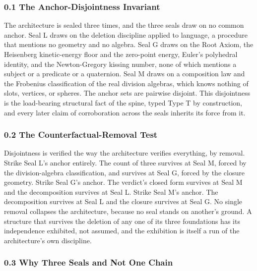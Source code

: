 \documentclass[10pt,twocolumn]{article}
\begin{document}
\hypertarget{the-anchor-disjointness-invariant}{%
\subsubsection{0.1 The Anchor-Disjointness
Invariant}\label{the-anchor-disjointness-invariant}}

The architecture is sealed three times, and the three seals draw on no
common anchor. Seal L draws on the deletion discipline applied to
language, a procedure that mentions no geometry and no algebra. Seal G
draws on the Root Axiom, the Heisenberg kinetic-energy floor and the
zero-point energy, Euler's polyhedral identity, and the Newton-Gregory
kissing number, none of which mentions a subject or a predicate or a
quaternion. Seal M draws on a composition law and the Frobenius
classification of the real division algebras, which knows nothing of
slots, vertices, or spheres. The anchor sets are pairwise disjoint. This
disjointness is the load-bearing structural fact of the spine, typed
Type T by construction, and every later claim of corroboration across
the seals inherits its force from it.

\hypertarget{the-counterfactual-removal-test}{%
\subsubsection{0.2 The Counterfactual-Removal
Test}\label{the-counterfactual-removal-test}}

Disjointness is verified the way the architecture verifies everything,
by removal. Strike Seal L's anchor entirely. The count of three survives
at Seal M, forced by the division-algebra classification, and survives
at Seal G, forced by the closure geometry. Strike Seal G's anchor. The
verdict's closed form survives at Seal M and the decomposition survives
at Seal L. Strike Seal M's anchor. The decomposition survives at Seal L
and the closure survives at Seal G. No single removal collapses the
architecture, because no seal stands on another's ground. A structure
that survives the deletion of any one of its three foundations has its
independence exhibited, not assumed, and the exhibition is itself a run
of the architecture's own discipline.

\hypertarget{why-three-seals-and-not-one-chain}{%
\subsubsection{0.3 Why Three Seals and Not One
Chain}\label{why-three-seals-and-not-one-chain}}
\end{document}
